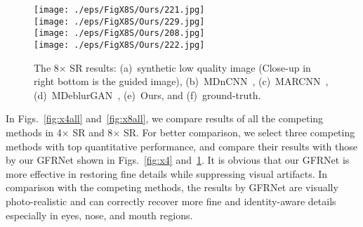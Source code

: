 \documentclass[runningheads]{llncs}
\begin{document}
\begin{figure}[htb]
{  \begin{minipage}[b]{.16\columnwidth}
    \texttt{[image: ./eps/FigX8S/Ours/221.jpg]}\\
    \texttt{[image: ./eps/FigX8S/Ours/229.jpg]}\\
    \texttt{[image: ./eps/FigX8S/Ours/208.jpg]}\\
    \texttt{[image: ./eps/FigX8S/Ours/222.jpg]}
  \end{minipage}
}
\hspace{-3ex}
\vspace{-2ex}
  \caption{The 8$\times$ SR results: (a)~synthetic low quality image (Close-up in right bottom is the guided image), (b)~MDnCNN~\cite{zhang2017beyond}, (c)~MARCNN~\cite{Dong2015ICCV}, (d)~MDeblurGAN~\cite{DeblurGAN}, (e)~Ours, and (f)~ground-truth.}
  \label{fig:x8}
\end{figure}
In Figs.~\ref{fig:x4all} and~\ref{fig:x8all}, we compare results of all the competing methods in 4$\times$ SR and 8$\times$ SR. For better comparison, we select three competing methods with top quantitative performance, and compare their results with those by our GFRNet shown in Figs.~\ref{fig:x4} and~\ref{fig:x8}.
It is obvious that our GFRNet is more effective in restoring fine details while suppressing visual artifacts.
In comparison with the competing methods, the results by GFRNet are visually photo-realistic and can correctly recover more fine and identity-aware details especially in eyes, nose, and mouth regions.
\end{document}
